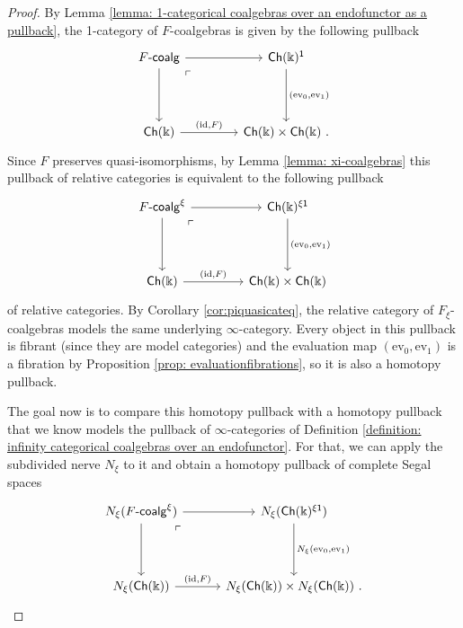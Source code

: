 \documentclass{proc-l}
\theoremstyle{plain}
\theoremstyle{definition}
\theoremstyle{remark}
\newcommand{\kk}{\Bbbk}
\begin{document}
\begin{proof}
By Lemma \ref{lemma: 1-categorical coalgebras over an endofunctor as a pullback}, the 1-category of $F$-coalgebras is given by the following pullback
\[
\begin{tikzcd}[column sep=3.5pc,row sep=3.5pc]
F\text{-}\mathsf{coalg} \arrow[r] \arrow[d] \arrow[dr, phantom, "\ulcorner", very near start]
& \mathsf{Ch}(\kk)^{\mathsf{1}} \arrow[d,"{(\mathrm{ev}_0,\mathrm{ev}_1)}"]  \\
\mathsf{Ch}(\kk) \arrow[r,"{(\mathrm{id},F)}"]
& \mathsf{Ch}(\kk) \times  \mathsf{Ch}(\kk)~.
\end{tikzcd}
\]
Since $F$ preserves quasi-isomorphisms, by Lemma \ref{lemma: xi-coalgebras} this pullback of relative categories is equivalent to the following pullback
\[
\begin{tikzcd}[column sep=3.5pc,row sep=3.5pc]
F\text{-}\mathsf{coalg}^{\xi} \arrow[r] \arrow[d] \arrow[dr, phantom, "\ulcorner", very near start]
&\mathsf{Ch}(\kk)^{\xi\mathsf{1}} \arrow[d,"{(\mathrm{ev}_0,\mathrm{ev}_1)}"]  \\
\mathsf{Ch}(\kk) \arrow[r,"{(\mathrm{id},F)}"]
&\mathsf{Ch}(\kk) \times  \mathsf{Ch}(\kk)
\end{tikzcd}
\]
of relative categories. By Corollary \ref{cor:piquasicateq}, the relative category of $F_\xi$-coalgebras models the same underlying $\infty$-category. Every object in this pullback is fibrant (since they are model categories) and the evaluation map $(\mathrm{ev}_0,\mathrm{ev}_1)$ is a fibration by Proposition \ref{prop: evaluationfibrations}, so it is also a homotopy pullback.

The goal now is to compare this homotopy pullback with a homotopy pullback that we know models the pullback of $\infty$-categories of Definition \ref{definition: infinity categorical coalgebras over an endofunctor}. For that, we can apply the subdivided nerve $N_\xi$ to it and obtain a homotopy pullback of complete Segal spaces
\[
\begin{tikzcd}[column sep=2.5pc,row sep=3.5pc]
N_{\xi}(F\text{-}\mathsf{coalg}^\xi) \arrow[r] \arrow[d] \arrow[dr, phantom, "\ulcorner", very near start]
& N_{\xi}(\mathsf{Ch}(\kk)^{\xi\mathsf{1}}) \arrow[d,"{ N_{\xi}(\mathrm{ev}_0,\mathrm{ev}_1)}"]  \\
N_{\xi}(\mathsf{Ch}(\kk)) \arrow[r,"{(\mathrm{id},F)}"]
& N_{\xi}(\mathsf{Ch}(\kk)) \times  N_{\xi}(\mathsf{Ch}(\kk))~.
\end{tikzcd}
\]


\end{proof}
\end{document}
